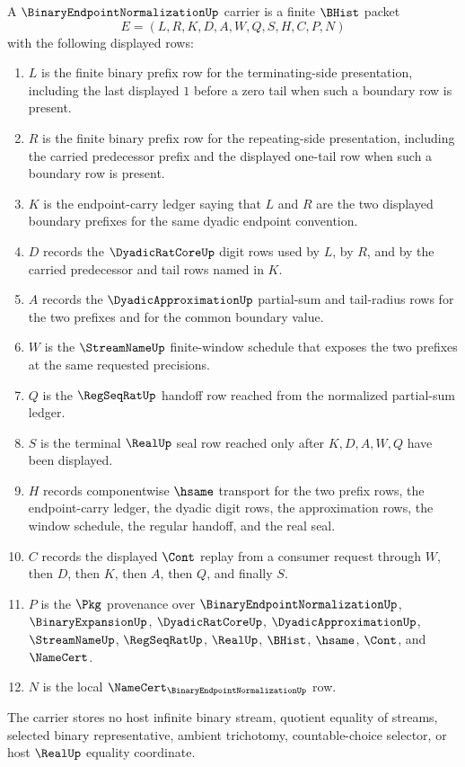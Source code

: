 \begin{definition}
\label{def:binary-endpoint-normalization-carrier}
A $\BinaryEndpointNormalizationUp$ carrier is a finite $\BHist$ packet
$$
E=(L,R,K,D,A,W,Q,S,H,C,P,N)
$$
with the following displayed rows:
\begin{enumerate}
\item $L$ is the finite binary prefix row for the terminating-side presentation, including the last displayed $1$ before a zero tail when such a boundary row is present.
\item $R$ is the finite binary prefix row for the repeating-side presentation, including the carried predecessor prefix and the displayed one-tail row when such a boundary row is present.
\item $K$ is the endpoint-carry ledger saying that $L$ and $R$ are the two displayed boundary prefixes for the same dyadic endpoint convention.
\item $D$ records the $\DyadicRatCoreUp$ digit rows used by $L$, by $R$, and by the carried predecessor and tail rows named in $K$.
\item $A$ records the $\DyadicApproximationUp$ partial-sum and tail-radius rows for the two prefixes and for the common boundary value.
\item $W$ is the $\StreamNameUp$ finite-window schedule that exposes the two prefixes at the same requested precisions.
\item $Q$ is the $\RegSeqRatUp$ handoff row reached from the normalized partial-sum ledger.
\item $S$ is the terminal $\RealUp$ seal row reached only after $K,D,A,W,Q$ have been displayed.
\item $H$ records componentwise $\hsame$ transport for the two prefix rows, the endpoint-carry ledger, the dyadic digit rows, the approximation rows, the window schedule, the regular handoff, and the real seal.
\item $C$ records the displayed $\Cont$ replay from a consumer request through $W$, then $D$, then $K$, then $A$, then $Q$, and finally $S$.
\item $P$ is the $\Pkg$ provenance over $\BinaryEndpointNormalizationUp$, $\BinaryExpansionUp$, $\DyadicRatCoreUp$, $\DyadicApproximationUp$, $\StreamNameUp$, $\RegSeqRatUp$, $\RealUp$, $\BHist$, $\hsame$, $\Cont$, and $\NameCert$.
\item $N$ is the local $\NameCert_{\BinaryEndpointNormalizationUp}$ row.
\end{enumerate}
The carrier stores no host infinite binary stream, quotient equality of streams, selected binary representative, ambient trichotomy, countable-choice selector, or host $\RealUp$ equality coordinate.
\end{definition}

